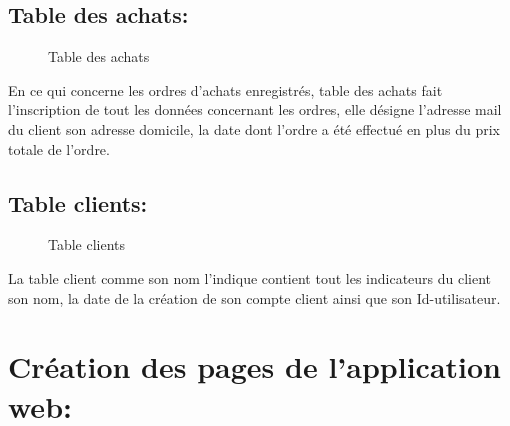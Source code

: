 \documentclass[a4paper]{report}
\begin{document}
\begin{doublespace}
\begin{doublespace}
\begin{doublespace}
\begin{doublespace}
\begin{doublespace}
\begin{doublespace}
                        \subsection{ Table des achats: }
                        \begin{figure}[H]

                            \caption{Table des achats}
                        \end{figure}
                        En ce qui concerne les ordres d'achats enregistrés, table  des achats fait l'inscription de tout les données concernant les ordres, elle désigne l'adresse mail du client son adresse domicile, la  date dont l'ordre a été effectué en plus du prix totale de l'ordre.
                        \subsection{ Table clients: }
                        \begin{figure}[H]

                            \caption{Table clients}
                        \end{figure}
                        La table client comme son nom l'indique contient tout les indicateurs du client son nom, la date de la création de son compte client ainsi que son Id-utilisateur.

                        \section{Création des pages de l'application web:}

\end{doublespace}
\end{doublespace}
\end{doublespace}
\end{doublespace}
\end{doublespace}
\end{doublespace}
\end{document}
